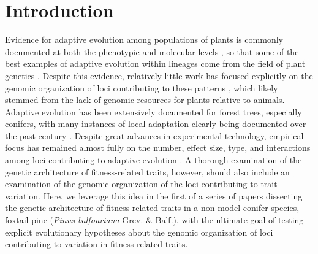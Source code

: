 \documentclass[smallextended]{svjour3}
\begin{document}
\section*{Introduction}

Evidence for adaptive evolution among populations of plants is commonly documented at both the phenotypic 
and molecular levels \citep{Kawecki:2004, Pannell:2013}, so that some of the best
examples of adaptive evolution within lineages come from the field of plant genetics \citep[e.g.,][]{Antonovics:1970}. 
Despite this evidence, relatively little work has focused explicitly on the genomic organization of loci contributing
to these patterns \citep{Hoffman:2008}, which likely stemmed from the lack of genomic resources for plants relative to animals.
Adaptive evolution has been extensively documented for forest trees, especially conifers, with many instances of 
local adaptation clearly being documented over the past century \citep{White:2007, Neale:2011}. Despite great advances 
in experimental technology, empirical focus has remained almost fully on the number, effect size, type, and interactions 
among loci contributing to adaptive evolution \citep{Neale:2011, Alberto:2013}.  A thorough examination of the 
genetic architecture of fitness-related traits, however, should also include 
an examination of the genomic organization of the loci contributing to trait variation. Here, we leverage 
this idea in the first of a series of papers dissecting the genetic architecture of fitness-related 
traits in a non-model conifer species, foxtail pine (\textit{Pinus balfouriana} Grev. \& Balf.), with the 
ultimate goal of testing explicit evolutionary hypotheses about the genomic organization of loci 
contributing to variation in fitness-related traits.
\end{document}

